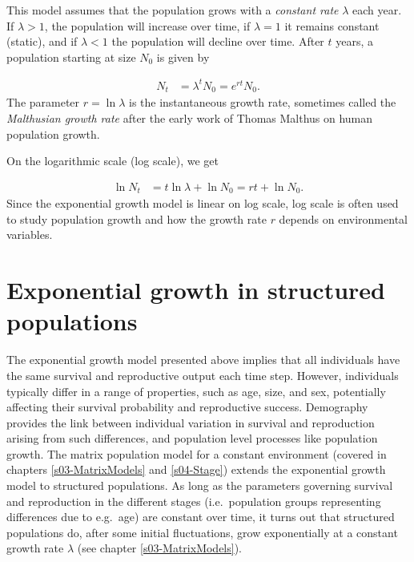 \documentclass[
]{book}
\begin{document}
This model assumes that the population grows with a \emph{constant rate} \(\lambda\) each year. If \(\lambda>1\), the population will increase over time, if \(\lambda=1\) it remains constant (static), and if \(\lambda<1\) the population will decline over time. After \(t\) years, a population starting at size \(N_0\) is given by

\begin{align}
N_t&=\lambda^tN_0=e^{rt}N_0.
\label{eq:exp2}
\end{align}
The parameter \(r=\ln \lambda\) is the instantaneous growth rate, sometimes called the \emph{Malthusian growth rate} after the early work of Thomas Malthus \citeyearpar{Malthus} on human population growth.

On the logarithmic scale (log scale), we get

\begin{align}
\ln N_t&=t \ln \lambda +\ln N_0=rt+\ln N_0.
\label{eq:exp3}
\end{align}
Since the exponential growth model is linear on log scale, log scale is often used to study population growth and how the growth rate \(r\) depends on environmental variables.

\hypertarget{exponential-growth-in-structured-populations}{%
\section{Exponential growth in structured populations}\label{exponential-growth-in-structured-populations}}

The exponential growth model presented above implies that all individuals have the same survival and reproductive output each time step. However, individuals typically differ in a range of properties, such as age, size, and sex, potentially affecting their survival probability and reproductive success. Demography provides the link between individual variation in survival and reproduction arising from such differences, and population level processes like population growth. The matrix population model for a constant environment (covered in chapters \ref{s03-MatrixModels} and \ref{s04-Stage}) extends the exponential growth model to structured populations. As long as the parameters governing survival and reproduction in the different stages (i.e.~population groups representing differences due to e.g.~age) are constant over time, it turns out that structured populations do, after some initial fluctuations, grow exponentially at a constant growth rate \(\lambda\) (see chapter \ref{s03-MatrixModels}).
\end{document}
